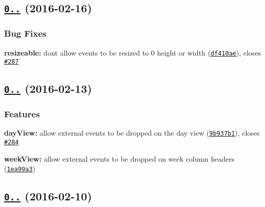 \label{_0.18.9}%
 \subsection*{\href{https://github.com/mattlewis92/angular-bootstrap-calendar/compare/0.18.8...v0.18.9}{\tt 0..} (2016-\/02-\/16)}

\subsubsection*{Bug Fixes}


\begin{DoxyItemize}
\item {\bfseries resizeable\+:} dont allow events to be resized to 0 height or width (\href{https://github.com/mattlewis92/angular-bootstrap-calendar/commit/df410ae}{\tt df410ae}), closes \href{https://github.com/mattlewis92/angular-bootstrap-calendar/issues/287}{\tt \#287}
\end{DoxyItemize}

\label{_0.18.8}%
 \subsection*{\href{https://github.com/mattlewis92/angular-bootstrap-calendar/compare/0.18.7...v0.18.8}{\tt 0..} (2016-\/02-\/13)}

\subsubsection*{Features}


\begin{DoxyItemize}
\item {\bfseries day\+View\+:} allow external events to be dropped on the day view (\href{https://github.com/mattlewis92/angular-bootstrap-calendar/commit/9b937b1}{\tt 9b937b1}), closes \href{https://github.com/mattlewis92/angular-bootstrap-calendar/issues/284}{\tt \#284}
\item {\bfseries week\+View\+:} allow external events to be dropped on week column headers (\href{https://github.com/mattlewis92/angular-bootstrap-calendar/commit/1ea99a3}{\tt 1ea99a3})
\end{DoxyItemize}

\label{_0.18.7}%
 \subsection*{\href{https://github.com/mattlewis92/angular-bootstrap-calendar/compare/0.18.6...v0.18.7}{\tt 0..} (2016-\/02-\/10)}

